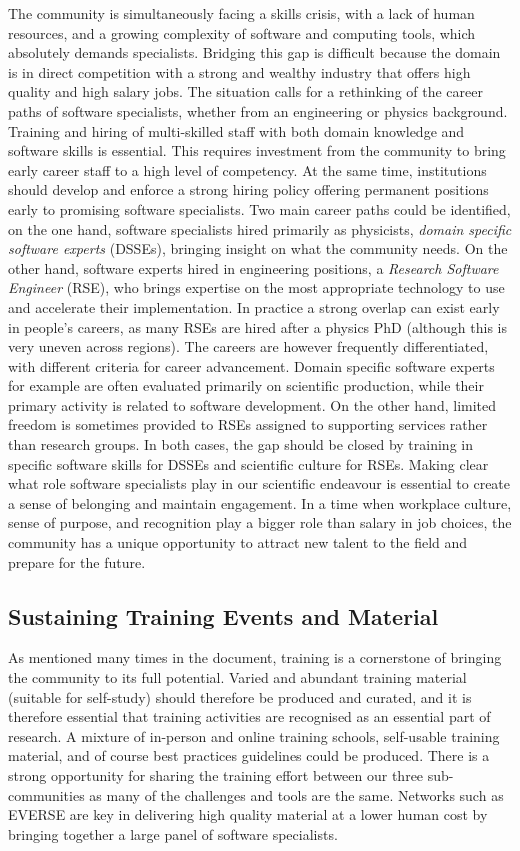 The community is simultaneously facing a skills crisis, with a lack of human resources, and a growing complexity of software and computing tools, which absolutely demands specialists. Bridging this gap is difficult because the domain is in direct competition with a strong and wealthy industry that offers high quality and high salary jobs. The situation calls for a rethinking of the career paths of software specialists, whether from an engineering or physics background.
Training and hiring of multi-skilled staff with both domain knowledge and software skills is essential. This requires investment from the community to bring early career staff to a high level of competency. At the same time, institutions should develop and enforce a strong hiring policy offering permanent positions early to promising software specialists.
Two main career paths could be identified, on the one hand, software specialists hired primarily as physicists, \emph{domain specific software experts} (DSSEs), bringing insight on what the community needs. On the other hand, software experts hired in engineering positions, a \emph{Research Software Engineer} (RSE), who brings expertise on the most appropriate technology to use and accelerate their implementation.
In practice a strong overlap can exist early in people's careers, as many RSEs are hired after a physics PhD (although this is very uneven across regions). The careers are however frequently differentiated, with different criteria for career advancement. Domain specific software experts for example are often evaluated primarily on scientific production, while their primary activity is related to software development. On the other hand, limited freedom is sometimes provided to RSEs assigned to supporting services rather than research groups. 
In both cases, the gap should be closed by training in specific software skills for DSSEs and scientific culture for RSEs. Making clear what role software specialists play in our scientific endeavour is essential to create a sense of belonging and maintain engagement. In a time when workplace culture, sense of purpose, and recognition play a bigger role than salary in job choices, the community has a unique opportunity to attract new talent to the field and prepare for the future.

\subsection{Sustaining Training Events and Material}

As mentioned many times in the document, training is a cornerstone of bringing the community to its full potential. Varied and abundant training material (suitable for self-study) should therefore be produced and curated, and it is therefore essential that training activities are recognised as an essential part of research.
A mixture of in-person and online training schools, self-usable training material, and of course best practices guidelines could be produced. There is a strong opportunity for sharing the training effort between our three sub-communities as many of the challenges and tools are the same. Networks such as EVERSE are key in delivering high quality material at a lower human cost by bringing together a large panel of software specialists.



